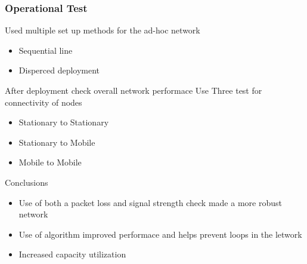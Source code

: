 \begin{frame}[t]
  \frametitle{Operational Test}

    Used multiple set up methods for the ad-hoc network
    \begin{itemize}
      \item Sequential line
      \item Disperced deployment
    \end{itemize}
    
    After deployment check overall network performace \linebreak
    Use Three test for connectivity of nodes
    \begin{itemize}
    \item Stationary to Stationary
    \item Stationary to Mobile
    \item Mobile to Mobile
    \end{itemize}
    
  \vfill
  
  Conclusions
  \begin{itemize}
  \item Use of both a packet loss and signal strength check made a more robust
    network
  \item Use of algorithm improved performace and helps prevent loops in the
    letwork
  \item Increased capacity utilization
  \end{itemize}
  
  \vfill
  
\end{frame}

